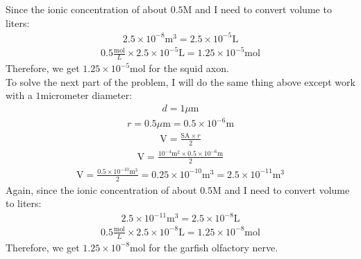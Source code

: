 \documentclass[11pt]{article}
\begin{document}
\begin{enumerate}[label=\arabic*.]
Since the ionic concentration of about $0.5 \text{M}$ and I need to convert volume to liters:
\begin{align*}
2.5 \times 10^{-8} \text{m}^3 = 2.5 \times 10^{-5} \text{L}
\end{align*}
\begin{align*}
0.5 \frac{\text{mol}} {L} \times 2.5 \times 10^{-5} \text{L} = 1.25 \times 10^{-5} \text{mol}
\end{align*}
Therefore, we get $1.25 \times 10^{-5} \text{mol}$ for the squid axon.
\vspace*{1\baselineskip}
\\
To solve the next part of the problem, I will do the same thing above except work with a $1 \text{micrometer}$ diameter:
\begin{align*}
d = 1 \mu \text{m}
\end{align*}
\begin{align*}
r = 0.5 \mu \text{m} = 0.5 \times 10^{-6} \text{m}
\end{align*}
\begin{align*}
\text{V} = \frac{\text{SA} \times r} {2}
\end{align*}
\begin{align*}
\text{V} = \frac{10^{-4} \text{m}^2 \times 0.5 \times 10^{-6} \text{m}} {2}
\end{align*}
\begin{align*}
\text{V} = \frac{0.5 \times 10^{-10} \text{m}^3} {2} = 0.25 \times 10^{-10} \text{m}^3 = 2.5 \times 10^{-11} \text{m}^3
\end{align*}
Again, since the ionic concentration of about $0.5 \text{M}$ and I need to convert volume to liters:
\begin{align*}
2.5 \times 10^{-11} \text{m}^3 = 2.5 \times 10^{-8} \text{L}
\end{align*}
\begin{align*}
0.5 \frac{\text{mol}} {L} \times 2.5 \times 10^{-8} \text{L} = 1.25 \times 10^{-8} \text{mol}
\end{align*}
Therefore, we get $1.25 \times 10^{-8} \text{mol}$ for the garfish olfactory nerve.




\end{enumerate}
\end{document}
